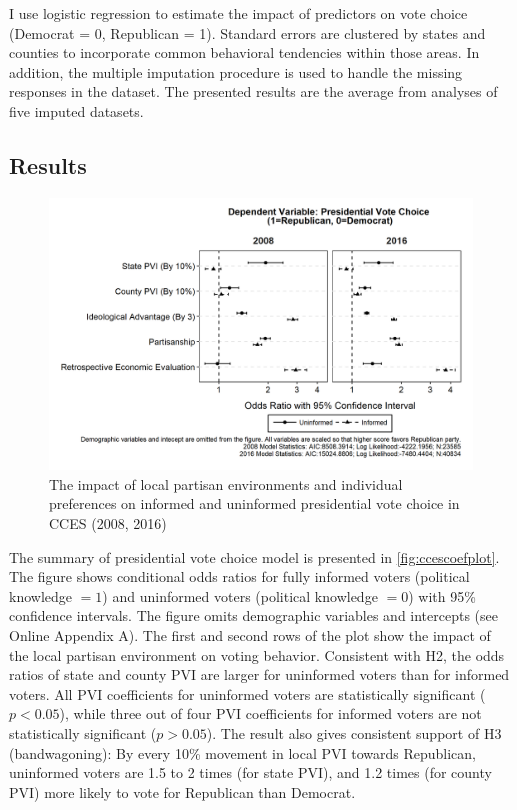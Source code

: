 \documentclass[letterpaper, 12pt]{article}
\begin{document}
    \par I use logistic regression to estimate the impact of predictors on vote choice (Democrat = 0, Republican = 1). Standard errors are clustered by states and counties to incorporate common behavioral tendencies within those areas. In addition, the multiple imputation procedure \citep{King2001anin} is used to handle the missing responses in the dataset. The presented results are the average from analyses of five imputed datasets.
    
    \subsection*{Results}
    
    \begin{figure}[t!]
        \caption{The impact of local partisan environments and individual preferences on informed and uninformed presidential vote choice in CCES (2008, 2016)}
        \label{fig:ccescoefplot}
        \includegraphics[width=\linewidth]{../outputs/ccescoefplot.png}
    \end{figure}

    \par The summary of presidential vote choice model is presented in \autoref{fig:ccescoefplot}. The figure shows conditional odds ratios for fully informed voters (political knowledge $= 1$) and uninformed voters (political knowledge $= 0$) with 95\% confidence intervals. The figure omits demographic variables and intercepts (see Online Appendix A). The first and second rows of the plot show the impact of the local partisan environment on voting behavior. Consistent with H2, the odds ratios of state and county PVI are larger for uninformed voters than for informed voters. All PVI coefficients for uninformed voters are statistically significant ($p<0.05$), while three out of four PVI coefficients for informed voters are not statistically significant ($p>0.05$). The result also gives consistent support of H3 (bandwagoning): By every 10\% movement in local PVI towards Republican, uninformed voters are 1.5 to 2 times (for state PVI), and 1.2 times (for county PVI) more likely to vote for Republican than Democrat.
    
\end{document}
